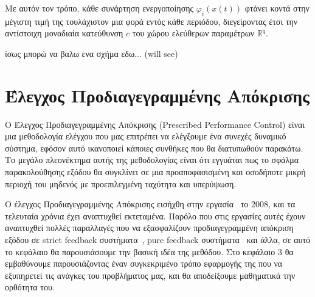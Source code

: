 Με αυτόν τον τρόπο, κάθε συνάρτηση ενεργοποίησης $\varphi_i(x(t))$ φτάνει κοντά στην μέγιστη τιμή της τουλάχιστον μια φορά εντός κάθε περιόδου, διεγείροντας έτσι την αντίστοιχη μοναδιαία κατεύθυνση $c$ του χώρου ελεύθερων παραμέτρων $\mathbb{R}^q$.

ίσως μπορώ να βαλω ενα σχήμα εδω... (will see)

\section{Έλεγχος Προδιαγεγραμμένης Απόκρισης} \label{sec:ppc_introduction}
Ο Έλεγχος Προδιαγεγραμμένης Απόκρισης (Prescribed Performance Control) είναι μια μεθοδολογία ελέγχου που μας επιτρέπει να ελέγξουμε ένα συνεχές δυναμικό σύστημα, εφόσον αυτό ικανοποιεί κάποιες συνθήκες που θα διατυπωθούν παρακάτω. Το μεγάλο πλεονέκτημα αυτής της μεθοδολογίας είναι ότι εγγυάται πως το σφάλμα παρακολούθησης εξόδου θα συγκλίνει σε μια προαποφασισμένη και οσοδήποτε μικρή περιοχή του μηδενός με προεπιλεγμένη ταχύτητα και υπερύψωση.

Ο έλεγχος Προδιαγεγραμμένης Απόκρισης εισήχθη στην εργασία~\cite{bechlioulis2008robust} το 2008, και τα τελευταία χρόνια έχει αναπτυχθεί εκτεταμένα. Παρόλο που στις εργασίες αυτές έχουν αναπτυχθεί πολλές παραλλαγές που να εξασφαλίζουν προδιαγεγραμμένη απόκριση εξόδου σε strict feedback συστήματα~\cite{bechlioulis2009adaptive}, pure feedback συστήματα~\cite{bechlioulis2014low} και άλλα, σε αυτό το κεφάλαιο θα παρουσιάσουμε την βασική ιδέα της μεθόδου. Στο κεφάλαιο 3 θα εμβαθύνουμε παρουσιάζοντας έναν συγκεκριμένο τρόπο εφαρμογής της που να εξυπηρετεί τις ανάγκες του προβλήματος μας, και θα αποδείξουμε μαθηματικά την ορθότητα του.

